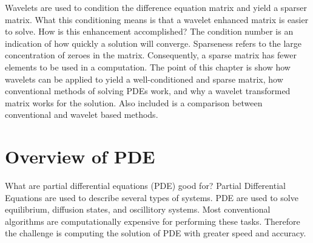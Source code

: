 
Wavelets are used to condition the difference equation matrix and yield a %
sparser matrix.  What this conditioning means is that a wavelet enhanced matrix is easier to solve.  How is this enhancement accomplished?  The condition number is an indication of how quickly a solution will converge.    Sparseness refers to the large concentration of zeroes in the matrix.  Consequently, a sparse matrix has fewer elements to be used in a computation.  The point of this chapter is show how wavelets can be applied to yield a well-conditioned and sparse matrix, how conventional methods of solving PDEs work,  and why a wavelet transformed matrix works for the solution.  Also included is a comparison between conventional and wavelet based methods.  


\section {Overview of PDE}
What are partial differential equations (PDE) good for?  
Partial Differential Equations are used to describe several types of systems.  
PDE are used to solve %
equilibrium, diffusion states, and oscillitory systems.  Most %
conventional algorithms are computationally expensive %
for performing these tasks.  Therefore the challenge is computing %
the solution of PDE with greater speed and accuracy.


